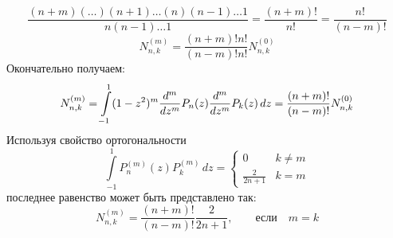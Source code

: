 \[
    \frac{(n + m) ( \ldots) (n + 1) \ldots (n) (n - 1) \dots 1}{n (n - 1) \ldots 1} = \frac{(n + m)!}{n!} = \frac{n!}{(n - m)!}
\]
\[
	N_{n,k}^{(m)} = \frac{(n + m)! n!}{(n - m)!n!} N_{n, k}^{(0)}
\]
Окончательно получаем:
\begin{equation}
    N_{n,k}^{(m)} = \int\limits_{-1}^1 (1 - z^2)^m \frac{d^{m}}{dz^{m}} P_n(z) \frac{d^{m}}{dz^{m}} P_k (z) \, dz = \frac{(n + m)! }{(n - m)! } N_{n,k}^{(0)}
\end{equation}
Используя свойство ортогональности
\[
    \int\limits_{-1}^1 P_n^{(m)} (z) P_k^{(m)} \, dz = 
	\begin{cases}
	    0 &k \neq m\\
	\frac{2}{2n + 1} &k=m
	\end{cases}
\]
последнее равенство может быть представлено так:
\begin{equation}
    N_{n,k}^{(m)} = \frac{(n + m)! }{(n - m)! } \frac{2}{2n + 1}, \qquad \text{если}\quad m = k
\end{equation}
